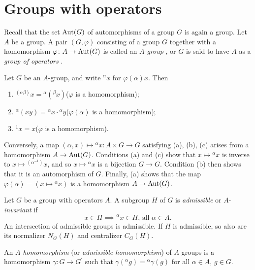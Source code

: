 \documentclass[a4paper,11pt,final]{memoir}%
\theoremstyle{nonumberplain}
\begin{document}
\section{Groups with operators}

Recall that the set $\operatorname{Aut}(G)$ of automorphisms of a group $G$ is again a
group. Let $A$ be a group. A pair $(G,\varphi)$ consisting of a group $G$
together with a homomorphism $\varphi\colon A\rightarrow\operatorname{Aut}(G)$ is called an
$A$\emph{-group}%
%
, or $G$ is said to have $A$ as a \emph{group of operators}%
%
.

Let $G$ be an $A$-group, and write $^{\alpha}x$ for $\varphi(\alpha)x$. Then

\begin{enumerate}
\item $^{(\alpha\beta)}x={}^{\alpha}({}^{\beta}x)$\qquad($\varphi$ is a homomorphism);

\item $^{\alpha}(xy)={}^{\alpha}x\cdot{}^{\alpha}y$\qquad($\varphi(\alpha)$ is
a homomorphism);{}

\item $^{1}x=x$\qquad\qquad($\varphi$ is a homomorphism).
\end{enumerate}

\noindent Conversely, a map $(\alpha,x)\mapsto{}^{\alpha}x:A\times
G\rightarrow G$ satisfying (a), (b), (c) arises from a homomorphism
$A\rightarrow\operatorname{Aut}(G)$. Conditions (a) and (c) show that $x\mapsto{}^{\alpha}x$
is inverse to $x\mapsto{}^{(\alpha^{-1})}x$, and so $x\mapsto{}^{\alpha}x$ is
a bijection $G\rightarrow G$. Condition (b) then shows that it is an
automorphism of $G$. Finally, (a) shows that the map $\varphi(\alpha
)=(x\mapsto{}^{\alpha}x)$ is a homomorphism $A\rightarrow\operatorname{Aut}(G)$.

Let $G$ be a group with operators $A$. A subgroup $H$ of $G$ is
\emph{admissible}%
%
\emph{\/} or $A$-\emph{invariant\/}%
if
\[
x\in H\implies{}^{\alpha}x\in H\text{, all }\alpha\in A.
\]
An intersection of admissible groups is admissible. If $H$ is admissible, so
also are its normalizer $N_{G}(H)$ and centralizer $C_{G}(H).$

An $A$\emph{-homomorphism\/} (or \emph{admissible homomorphism\/})%
of $A$-groups is a homomorphism $\gamma\colon G\rightarrow G^{\prime}$ such
that $\gamma({}^{\alpha}g)={}^{\alpha}\gamma(g)$ for all $\alpha\in A$, $g\in
G.$
\end{document}

